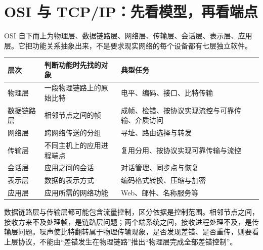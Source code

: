 \section{OSI 与 TCP/IP：先看模型，再看端点}\label{CN01-06}

OSI 自下而上为物理层、数据链路层、网络层、传输层、会话层、表示层、应用层。它把功能关系抽象出来，不是要求现实网络的每个设备都有七层独立软件。

\begin{wideblock}

\par\medskip\noindent\begin{minipage}{\linewidth}\fontsize{9.3}{12}\selectfont\begin{tabularx}{\linewidth}{@{}YYY@{}}
\toprule\noalign{}
\begin{minipage}[b]{\linewidth}\raggedright
层次
\end{minipage} & \begin{minipage}[b]{\linewidth}\raggedright
判断功能时先找的对象
\end{minipage} & \begin{minipage}[b]{\linewidth}\raggedright
典型任务
\end{minipage} \\
\midrule\noalign{}


物理层 & 一段物理链路上的原始比特 & 电平、编码、接口、比特传输 \\
数据链路层 & 相邻节点之间的帧 & 成帧、检错、按协议实现流控与可靠传输、介质访问 \\
网络层 & 跨网络传送的分组 & 寻址、路由选择与转发 \\
传输层 & 不同主机上的应用进程端点 & 复用分用、按协议实现可靠传输与流控 \\
会话层 & 应用之间的会话 & 对话管理、同步点与恢复 \\
表示层 & 数据的表示方式 & 编码格式转换、压缩与加密 \\
应用层 & 应用所需的网络功能 & Web、邮件、名称服务等 \\
\bottomrule\end{tabularx}
\end{minipage}\par\medskip

\end{wideblock}

数据链路层与传输层都可能包含流量控制，区分依据是控制范围。相邻节点之间，接收方来不及处理帧，是链路层问题；两个端系统之间，接收进程处理不及，是传输层问题。噪声使比特翻转属于物理传输现象，是否发现差错、是否重传，则要看上层协议，不能由``差错发生在物理链路''推出``物理层完成全部差错控制''。

